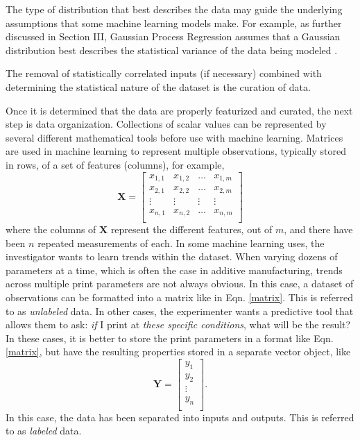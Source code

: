 The type of distribution that best describes the data may guide the underlying assumptions that some machine learning models make. For example, as further discussed in Section III, Gaussian Process Regression assumes that a Gaussian distribution best describes the statistical variance of the data being modeled \cite{Ripley1981, Schabenberger2004}.

The removal of statistically correlated inputs (if necessary) combined with determining the statistical nature of the dataset is the curation of data.

Once it is determined that the data are properly featurized and curated, the next step is data organization. Collections of scalar values can be represented by several different mathematical tools before use with machine learning. Matrices are used in machine learning to represent multiple observations, typically stored in rows, of a set of features (columns), for example,
\begin{equation}
	\mathbf{X} = \begin{bmatrix} x_{1,1} & x_{1,2} & \hdots & x_{1,m} \\
						x_{2,1} & x_{2,2} & \hdots & x_{2,m} \\
						\vdots & \vdots & \vdots & \vdots \\
						x_{n,1} & x_{n,2} & \hdots & x_{n,m} \\
				\end{bmatrix}
	\label{matrix}
\end{equation}
where the columns of $\mathbf{X}$ represent the different features, out of $m$, and there have been $n$ repeated measurements of each. In some machine learning uses, the investigator wants to learn trends within the dataset. When varying dozens of parameters at a time, which is often the case in additive manufacturing, trends across multiple print parameters are not always obvious. In this case, a dataset of observations can be formatted into a matrix like in Eqn. \ref{matrix}. This is referred to as \textit{unlabeled} data. In other cases, the experimenter wants a predictive tool that allows them to ask: \textit{if} I print at \textit{these specific conditions}, what will be the result? In these cases, it is better to store the print parameters in a format like Eqn. \ref{matrix}, but have the resulting properties stored in a separate vector object, like
\begin{equation}
	\mathbf{Y} = \begin{bmatrix} y_{1} \\
				y_{2} \\
				\vdots \\
				y_{n} \\
				\end{bmatrix}.
			\label{outputs}
\end{equation}
In this case, the data has been separated into inputs and outputs. This is referred to as \textit{labeled} data.

